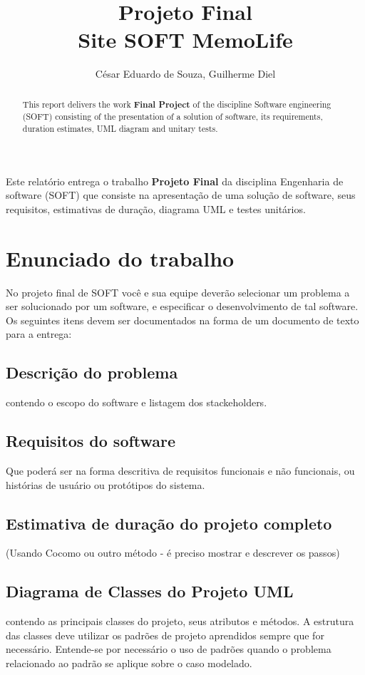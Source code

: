 \documentclass[12pt]{article}
\title{Projeto Final\\ Site SOFT MemoLife}
\author{César Eduardo de Souza, Guilherme Diel}
\begin{document}
 

\maketitle

\begin{abstract}
  This report delivers the work \textbf{Final Project} of the discipline
  Software engineering (SOFT) consisting of the presentation of a solution
  of software, its requirements, duration estimates, UML diagram and
  unitary tests.
\end{abstract}
     
\begin{resumo} 
  Este relatório entrega o trabalho \textbf{Projeto Final} da disciplina 
  Engenharia de software (SOFT) que consiste na apresentação de uma solução
  de software, seus requisitos, estimativas de duração, diagrama UML e
  testes unitários.
\end{resumo}


\section{Enunciado do trabalho}
No projeto final de SOFT você e sua equipe deverão selecionar um problema a ser solucionado por um software, e especificar o desenvolvimento de tal software. Os seguintes itens devem ser documentados na forma de um documento de texto para a entrega:

\subsection{Descrição do problema}
contendo o escopo do software e listagem dos stackeholders.

\subsection{Requisitos do software}
Que poderá ser na forma descritiva de requisitos funcionais e não funcionais, ou histórias de usuário ou protótipos do sistema.

\subsection{Estimativa de duração do projeto completo}
(Usando Cocomo ou outro método - é preciso mostrar e descrever os passos)

\subsection{Diagrama de Classes do Projeto UML}
contendo as principais classes do projeto, seus atributos e métodos. A estrutura das classes deve utilizar os padrões de projeto aprendidos sempre que for necessário. Entende-se por necessário o uso de padrões quando o problema relacionado ao padrão se aplique sobre o caso modelado.
\end{document}
